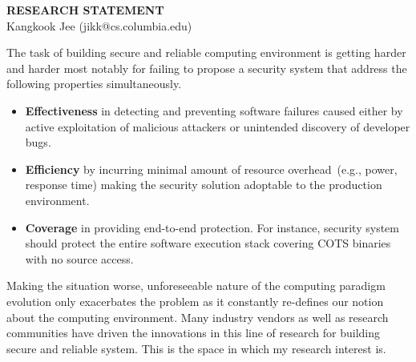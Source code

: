 \documentclass[letterpaper, 10pt]{article}
\begin{document}
\begin{small}

\begin{center}
{\LARGE \bf RESEARCH STATEMENT}\\
\vspace*{0.1cm}
{\normalsize Kangkook Jee (jikk@cs.columbia.edu)}
\end{center}



The task of building secure and reliable computing environment is getting
harder and harder most notably for failing to propose a security system that
address the following properties simultaneously.

\begin{itemize}

        \item {\bf Effectiveness} in detecting and preventing software failures
                caused either by active exploitation of malicious attackers or
                unintended discovery of developer bugs.

        \item {\bf Efficiency} by incurring minimal amount of resource
                overhead~(e.g., power, response time) making the security
                solution adoptable to the production environment.

        \item {\bf Coverage} in providing end-to-end protection. For instance,
                security system should protect the entire software execution
                stack covering COTS binaries with no source access.

\end{itemize}

Making the situation worse, unforeseeable nature of the computing paradigm
evolution only exacerbates the problem as it constantly re-defines our notion
about the computing environment.
%
Many industry vendors as well as research communities have driven the
innovations in this line of research for building secure and reliable system.
This is the space in which my research interest is.


\end{small}
\end{document}
